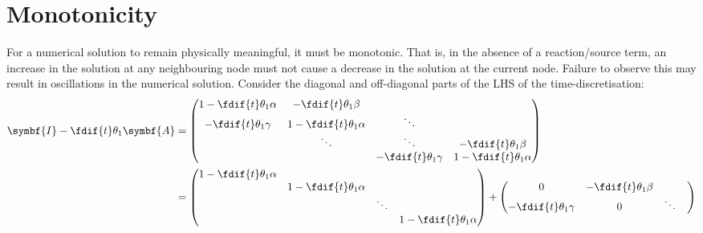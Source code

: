 \documentclass{article}
\begin{document}
\section{Monotonicity}
For a numerical solution to remain physically meaningful, it must be
monotonic. That is, in the absence of a reaction/source term, an
increase in the solution at any neighbouring node must not cause a
decrease in the solution at the current node. Failure to observe this
may result in oscillations in the numerical solution. Consider the
diagonal and off-diagonal parts of the LHS of the time-discretisation:
\begin{align*}
    \symbf{I} - \fdif{t} \theta_1 \symbf{A} & =
    \begin{pmatrix}
        1 - \fdif{t} \theta_1 \alpha & -\fdif{t} \theta_1 \beta     &                           &                              \\
        -\fdif{t} \theta_1 \gamma    & 1 - \fdif{t} \theta_1 \alpha & \ddots                    &                              \\
                                     & \ddots                       & \ddots                    & -\fdif{t} \theta_1 \beta     \\
                                     &                              & -\fdif{t} \theta_1 \gamma & 1 - \fdif{t} \theta_1 \alpha
    \end{pmatrix}
    \\
                                            & =
    \begin{pmatrix}
        1 - \fdif{t} \theta_1 \alpha &                              &        &                              \\
                                     & 1 - \fdif{t} \theta_1 \alpha &        &                              \\
                                     &                              & \ddots &                              \\
                                     &                              &        & 1 - \fdif{t} \theta_1 \alpha
    \end{pmatrix}
    +
    \begin{pmatrix}
        0                         & -\fdif{t} \theta_1 \beta &                           &                          \\
        -\fdif{t} \theta_1 \gamma & 0                        & \ddots                    &                          \\

\end{pmatrix}
\end{align*}
\end{document}
